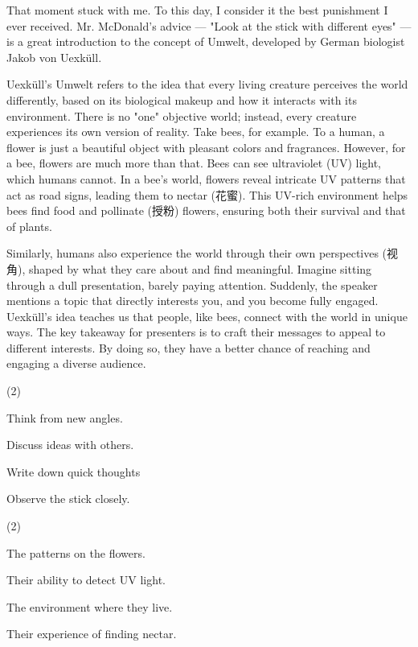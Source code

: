 \documentclass{英语试卷}
\begin{document}
\par That moment stuck with me. To this day, I consider it the best punishment I ever received. Mr. McDonald's advice — "Look at the stick with different eyes" — is a great introduction to the concept of Umwelt, developed by German biologist Jakob von Uexküll.\par
\par Uexküll's Umwelt refers to the idea that every living creature perceives the world differently, based on its biological makeup and how it interacts with its environment. There is no "one" objective world; instead, every creature experiences its own version of reality. Take bees, for example. To a human, a flower is just a beautiful object with pleasant colors and fragrances. However, for a bee, flowers are much more than that. Bees can see ultraviolet (UV) light, which humans cannot. In a bee’s world, flowers reveal intricate UV patterns that act as road signs, leading them to nectar (花蜜). This UV-rich environment helps bees find food and pollinate (授粉) flowers, ensuring both their survival and that of plants.\par
\par Similarly, humans also experience the world through their own perspectives (视角), shaped by what they care about and find meaningful. Imagine sitting through a dull presentation, barely paying attention. Suddenly, the speaker mentions a topic that directly interests you, and you become fully engaged. Uexküll's idea teaches us that people, like bees, connect with the world in unique ways. The key takeaway for presenters is to craft their messages to appeal to different interests. By doing so, they have a better chance of reaching and engaging a diverse audience.\par
{}
\begin{choices}(2)
  \item Think from new angles.
  \item Discuss ideas with others.
  \item Write down quick thoughts
  \item Observe the stick closely.
\end{choices}
\begin{choices}(2)
  \item The patterns on the flowers.
  \item Their ability to detect UV light.
  \item The environment where they live.
  \item Their experience of finding nectar.
\end{choices}
\end{document}

